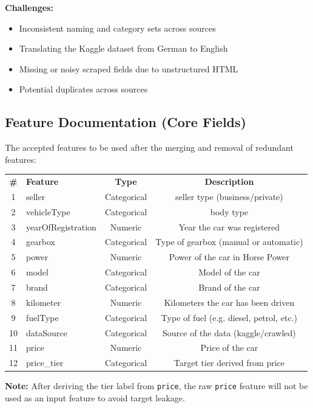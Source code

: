 \documentclass[12pt, a4paper]{article}
\begin{document}
\textbf{Challenges:}
\begin{itemize}
  \item Inconsistent naming and category sets across sources
  \item Translating the Kaggle dataset from German to English
  \item Missing or noisy scraped fields due to unstructured HTML
  \item Potential duplicates across sources
\end{itemize}
\subsection{Feature Documentation (Core Fields)}

The accepted features to be used after the merging and removal of redundant features:
\begin{center}
\renewcommand{\arraystretch}{1.6}
\begin{tabular}{c l c c}
  \rowcolor{navy}
  {\color{white}\small\bfseries \#} &
  {\color{white}\small\bfseries Feature} &
  {\color{white}\small\bfseries Type} &
  {\color{white}\small\bfseries Description} \\
  \rowcolor{lightgray}
  1 & seller & Categorical & seller type (business/private) \\
  \rowcolor{white}
  2 & vehicleType & Categorical & body type \\
  \rowcolor{lightgray}
  3 & yearOfRegistration & Numeric & Year the car was registered \\
  \rowcolor{white}
  4 & gearbox & Categorical & Type of gearbox (manual or automatic) \\
  \rowcolor{lightgray}
  5 & power & Numeric & Power of the car in Horse Power \\
  \rowcolor{white}
  6 & model & Categorical & Model of the car \\
  \rowcolor{lightgray}
  7 & brand & Categorical & Brand of the car \\
  \rowcolor{white}
  8 & kilometer & Numeric & Kilometers the car has been driven \\
  \rowcolor{lightgray}
  9 & fuelType & Categorical & Type of fuel (e.g. diesel, petrol, etc.) \\
  \rowcolor{white}
  10 & dataSource & Categorical & Source of the data (kaggle/crawled) \\
  \rowcolor{lightgray}
  11 & price & Numeric & Price of the car \\
  \rowcolor{white}
  12 & price\_tier & Categorical & Target tier derived from price \\
\end{tabular}
\end{center}
\vspace{0.25cm}
\textbf{Note:} After deriving the tier label from \texttt{price}, the raw \texttt{price} feature will not be used as an input feature to avoid target leakage.
\end{document}
